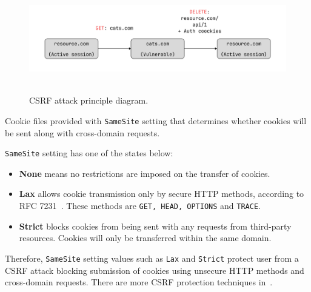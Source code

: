 \begin{figure}[H]
    \centering
    \includegraphics[width=1\textwidth]{img/Csrf_diagram}
    ~\caption{CSRF attack principle diagram.}\label{fig:csrf_diagram}
\end{figure}

Cookie files provided with \texttt{SameSite} setting that determines whether cookies will be sent
along with cross-domain requests.

\texttt{SameSite} setting has one of the states below:

\begin{itemize}
    \item \textbf{None} means no restrictions are imposed on the transfer of cookies.
    \item \textbf{Lax} allows cookie transmission only by secure HTTP methods, according to RFC 7231~\cite{fielding2014rfc}.
    These methods are \texttt{GET, HEAD, OPTIONS} and \texttt{TRACE}.
    \item \textbf{Strict} blocks cookies from being sent with any requests from third-party resources.
    Cookies will only be transferred within the same domain.
\end{itemize}

Therefore, \texttt{SameSite} setting values such as \texttt{Lax} and \texttt{Strict} protect user from a CSRF attack
blocking submission of cookies using unsecure HTTP methods and cross-domain requests.
There are more CSRF protection techniques in~\cite{owaspCsrf}.